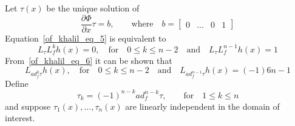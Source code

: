 \documentclass[11pt,a4paper,oneside]{book}
\numberwithin{equation}{section}
\theoremstyle{it}
\theoremstyle{definition}
\begin{document}
Let $\tau(x)$ be the unique solution of
\begin{equation}\label{of_khalil_eq_5}
	\frac{\partial \Phi}{\partial x}\tau=b,\qquad \text{where}\quad b=\begin{bmatrix}0&\dots&0&1 \end{bmatrix}
\end{equation}
Equation~\eqref{of_khalil_eq_5} is equivalent to
\begin{equation}\label{of_khalil_eq_6}
	L_{\tau}L_f^kh(x)=0,\quad\text{for}\quad0\le k\le n-2\quad\text{and}\quad L_{\tau}L_f^{n-1}h(x)=1
\end{equation}
From~\eqref{of_khalil_eq_6} it can be shown that 
\begin{equation}\label{of_khalil_eq_7}
	L_{ad_f^k\tau}h(x),\quad\text{for}\quad0\le k\le n-2\quad\text{and}\quad L_{ad_f^{n-1}\tau}h(x)=(-1)6{n-1}
\end{equation}
Define
\begin{equation}
	\tau_k=(-1)^{n-k}ad_f^{n-k}\tau,\qquad\text{for}\quad1\le k\le n
\end{equation}
and suppose $\tau_1(x),\dots,\tau_n(x)$ are linearly independent in the domain of interest. 
\end{document}
